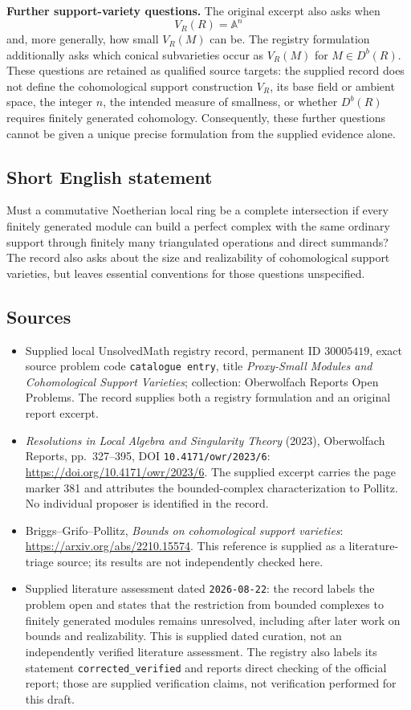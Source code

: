 \documentclass[11pt]{article}
\newcommand{\A}{\mathbb{A}}
\begin{document}
\textbf{Further support-variety questions.} The original excerpt also asks when
\[
V_R(R)=\A^n
\]
and, more generally, how small \(V_R(M)\) can be. The registry formulation additionally asks which conical subvarieties occur as \(V_R(M)\) for \(M\in D^b(R)\). These questions are retained as qualified source targets: the supplied record does not define the cohomological support construction \(V_R\), its base field or ambient space, the integer \(n\), the intended measure of smallness, or whether \(D^b(R)\) requires finitely generated cohomology. Consequently, these further questions cannot be given a unique precise formulation from the supplied evidence alone.
\subsection{Short English statement}
Must a commutative Noetherian local ring be a complete intersection if every finitely generated module can build a perfect complex with the same ordinary support through finitely many triangulated operations and direct summands? The record also asks about the size and realizability of cohomological support varieties, but leaves essential conventions for those questions unspecified.
\subsection{Sources}
\begin{itemize}
\item Supplied local UnsolvedMath registry record, permanent ID \(30005419\), exact source problem code \texttt{catalogue entry}, title \emph{Proxy-Small Modules and Cohomological Support Varieties}; collection: Oberwolfach Reports Open Problems. The record supplies both a registry formulation and an original report excerpt.
\item \emph{Resolutions in Local Algebra and Singularity Theory} (2023), Oberwolfach Reports, pp.~327--395, DOI \texttt{10.4171/owr/2023/6}: \url{https://doi.org/10.4171/owr/2023/6}. The supplied excerpt carries the page marker 381 and attributes the bounded-complex characterization to Pollitz. No individual proposer is identified in the record.
\item Briggs--Grifo--Pollitz, \emph{Bounds on cohomological support varieties}: \url{https://arxiv.org/abs/2210.15574}. This reference is supplied as a literature-triage source; its results are not independently checked here.
\item Supplied literature assessment dated \texttt{2026-08-22}: the record labels the problem open and states that the restriction from bounded complexes to finitely generated modules remains unresolved, including after later work on bounds and realizability. This is supplied dated curation, not an independently verified literature assessment. The registry also labels its statement \texttt{corrected\_verified} and reports direct checking of the official report; those are supplied verification claims, not verification performed for this draft.
\end{itemize}
\end{document}
